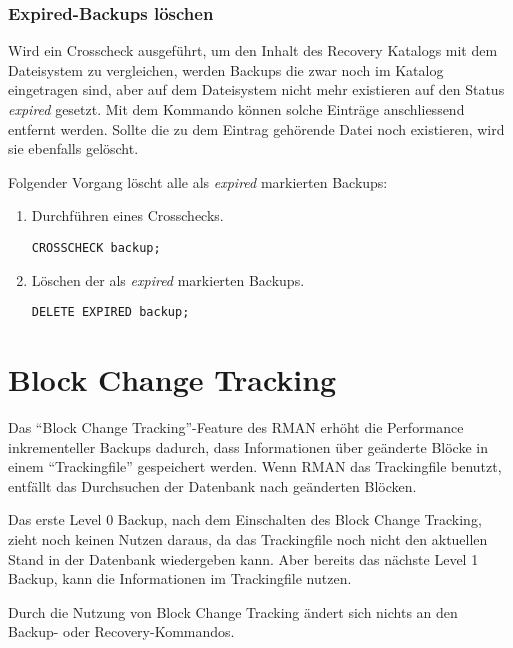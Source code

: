         \subsubsection{Expired-Backups löschen}
          Wird ein Crosscheck ausgeführt, um den Inhalt des Recovery Katalogs
          mit dem Dateisystem zu vergleichen, werden Backups die zwar noch im
          Katalog eingetragen sind, aber auf dem Dateisystem nicht mehr
          existieren auf den Status \textit{expired} gesetzt. Mit dem Kommando
           können solche Einträge anschliessend
          entfernt werden. Sollte die zu dem Eintrag gehörende Datei noch
          existieren, wird sie ebenfalls gelöscht.

          Folgender Vorgang löscht alle als \textit{expired} markierten
          Backups:
          \begin{enumerate}
            \item Durchführen eines Crosschecks.
              \begin{lstlisting}[caption={CROSSCHECK durchführen},label=admin1342,language=rman]
CROSSCHECK backup;
              \end{lstlisting}
            \item Löschen der als \textit{expired} markierten Backups.
              \begin{lstlisting}[caption={Löschen der Backups},label=admin1343,language=rman]
DELETE EXPIRED backup;
              \end{lstlisting}
          \end{enumerate}
      \section{Block Change Tracking}
        Das \enquote{Block Change Tracking}-Feature des RMAN erhöht die Performance inkrementeller Backups dadurch, dass Informationen über geänderte Blöcke in einem \enquote{Trackingfile} gespeichert werden. Wenn RMAN das Trackingfile benutzt, entfällt das Durchsuchen der Datenbank nach geänderten Blöcken.

        Das erste Level 0 Backup, nach dem Einschalten des Block Change Tracking, zieht noch keinen Nutzen daraus, da das Trackingfile noch nicht den aktuellen Stand in der Datenbank wiedergeben kann. Aber bereits das nächste Level 1 Backup, kann die Informationen im Trackingfile nutzen.

        \begin{merke}
          Durch die Nutzung von Block Change Tracking ändert sich nichts an den Backup- oder Recovery-Kommandos.
        \end{merke}


